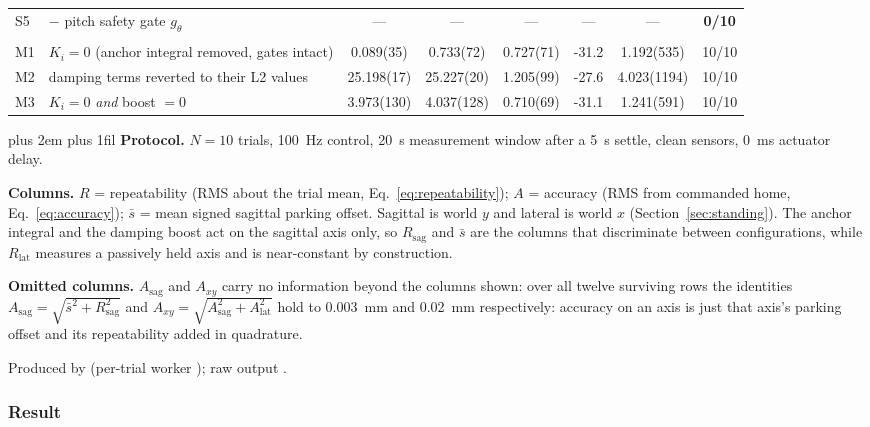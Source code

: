 \documentclass[a4paper,fleqn]{cas-dc}
\newcommand{\tabnote}{\par\leftskip=0pt\rightskip=0pt plus 2em%
  \parfillskip=0pt plus 1fil\relax}
\begin{document}
\begin{table}[pos=!tp]
\begin{tabular}{@{}ll S[table-format=2.3(4)] S[table-format=2.3(3)] S[table-format=2.3(4)] S[table-format=-2.1] S[table-format=2.3(4)] c@{}}
S5 & $-$ pitch safety gate $g_\theta$ & {---} & {---} & {---} & {---} & {---} & \textbf{0/10} \\
\addlinespace
{}\\
M1 & $K_i{=}0$ (anchor integral removed, gates intact) & 0.089(35) & 0.733(72) & 0.727(71) & -31.2 & 1.192(535) & 10/10 \\
M2 & damping terms reverted to their L2 values & 25.198(17) & 25.227(20) & 1.205(99) & -27.6 & 4.023(1194) & 10/10 \\
M3 & $K_i{=}0$ \emph{and} boost $=0$ & 3.973(130) & 4.037(128) & 0.710(69) & -31.1 & 1.241(591) & 10/10 \\
\bottomrule
\end{tabular}
\vspace{2pt}\tabnote\noindent
\textbf{Protocol.} $N{=}10$ trials, \SI{100}{Hz} control, \SI{20}{s} measurement
window after a \SI{5}{s} settle, clean sensors, \SI{0}{ms} actuator delay.

\noindent\textbf{Columns.} $R$ = repeatability (RMS about the trial mean,
Eq.~\eqref{eq:repeatability}); $A$ = accuracy (RMS from commanded home,
Eq.~\eqref{eq:accuracy}); $\bar{s}$ = mean signed sagittal parking offset.
Sagittal is world $y$ and lateral is world $x$ (Section~\ref{sec:standing}). The
anchor integral and the damping boost act on the sagittal axis only, so
$R_{\text{sag}}$ and $\bar{s}$ are the columns that discriminate between
configurations, while $R_{\text{lat}}$ measures a passively held axis and is
near-constant by construction.

\noindent\textbf{Omitted columns.} $A_{\text{sag}}$ and $A_{xy}$ carry no
information beyond the columns shown: over all twelve surviving rows the
identities $A_{\text{sag}}=\sqrt{\bar{s}^{2}+R_{\text{sag}}^{2}}$ and
$A_{xy}=\sqrt{A_{\text{sag}}^{2}+A_{\text{lat}}^{2}}$ hold to \SI{0.003}{mm}
and \SI{0.02}{mm} respectively: accuracy on an axis is just that axis's
parking offset and its repeatability added in quadrature.

\noindent Produced by  (per-trial worker
); raw output
.
\end{table}

\subsubsection{Result}
\end{document}
